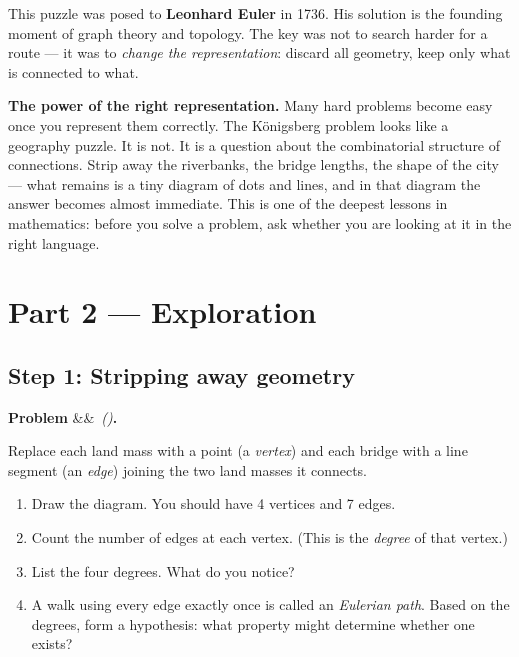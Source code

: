 \documentclass[12pt, a4paper]{article}
\newcounter{problem}
\newenvironment{problem}[1][]{%
  \refstepcounter{problem}%
  \par\vspace{6pt}%
  \noindent\textbf{\color{MidBlue}Problem \theproblem}%
  \ifx&#1&\else\ \textit{(#1)}\fi\textbf{.}\enskip
}{\par\vspace{4pt}}
\begin{document}
\medskip
This puzzle was posed to \textbf{Leonhard Euler} in 1736. His solution is the founding moment of graph theory and topology. The key was not to search harder for a route --- it was to \emph{change the representation}: discard all geometry, keep only what is connected to what.

\begin{thought}
\textbf{The power of the right representation.}
Many hard problems become easy once you represent them correctly. The K\"{o}nigsberg problem looks like a geography puzzle. It is not. It is a question about the combinatorial structure of connections. Strip away the riverbanks, the bridge lengths, the shape of the city --- what remains is a tiny diagram of dots and lines, and in that diagram the answer becomes almost immediate. This is one of the deepest lessons in mathematics: before you solve a problem, ask whether you are looking at it in the right language.
\end{thought}

\section{Part 2 --- Exploration}

\subsection{Step 1: Stripping away geometry}

\begin{problem}
\label{prob:konigsberg}
Replace each land mass with a point (a \emph{vertex}) and each bridge with a line segment (an \emph{edge}) joining the two land masses it connects.
\begin{enumerate}[label=(\alph*),topsep=2pt]
  \item Draw the diagram. You should have 4 vertices and 7 edges.
  \item Count the number of edges at each vertex. (This is the \emph{degree} of that vertex.)
  \item List the four degrees. What do you notice?
  \item A walk using every edge exactly once is called an \emph{Eulerian path}. Based on the degrees, form a hypothesis: what property might determine whether one exists?
\end{enumerate}
\end{problem}

\begin{center}
\end{center}
\end{document}

